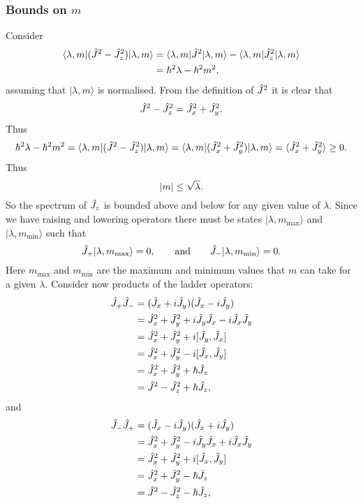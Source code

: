 \documentclass[a4paper]{article}
\renewcommand{\ket}[1]{\vert {#1} \rangle}
\renewcommand{\bra}[1]{\langle {#1} \vert}
\theoremstyle{definition}
\begin{document}
    \subsubsection{Bounds on \texorpdfstring{\(m\)}{m}}\label{sec:Bounds on m}
    Consider
    \begin{align*}
        \bra{\lambda, m}(\operator{J}^2 - \operator{J}_z^2)\ket{\lambda, m} &= \bra{\lambda, m}\operator{J}^2\ket{\lambda, m} - \bra{\lambda, m}\operator{J}_z^2\ket{\lambda, m}\\
        &= \hbar^2\lambda - \hbar^2m^2,
    \end{align*}
    assuming that \(\ket{\lambda, m}\) is normalised.
    From the definition of \(\hat{J}^2\) it is clear that
    \[\hat{J}^2 - \hat{J}_z^2 = \hat{J}_x^2 + \hat{J}_y^2.\]
    Thus
    \[\hbar^2\lambda - \hbar^2m^2 = \bra{\lambda, m}(\operator{J}^2 - \operator{J}_z^2)\ket{\lambda, m}  = \bra{\lambda, m}(\operator{J}_x^2 + \operator{J}_y^2)\ket{\lambda, m} = \expected{\operator{J}_x^2 + \operator{J}_y^2} \ge 0.\]
    Thus
    \[\abs{m} \le \sqrt{\lambda}.\]
    So the spectrum of \(\hat{J}_z\) is bounded above and below for any given value of \(\lambda\).
    Since we have raising and lowering operators there must be states \(\ket{\lambda, m_{\max}}\) and \(\ket{\lambda, m_{\min}}\) such that
    \[\operator{J}_+\ket{\lambda, m_{\max}} = 0,\qquad\text{and}\qquad \operator{J}_-\ket{\lambda, m_{\min}} = 0.\]
    Here \(m_{\max}\) and \(m_{\min}\) are the maximum and minimum values that \(m\) can take for a given \(\lambda\).
    Consider now products of the ladder operators:
    \begin{align*}
        \hat{J}_+\hat{J}_- &= (\hat{J}_x + i\hat{J}_y)(\hat{J}_x - i\hat{J}_y)\\
        &= \hat{J}_x^2 + \hat{J}_y^2 + i\hat{J}_y\hat{J}_x - i\hat{J}_x\hat{J}_y\\
        &= \hat{J}_x^2 + \hat{J}_y^2 + i[\hat{J}_y, \hat{J}_x]\\
        &= \hat{J}_x^2 + \hat{J}_y^2 - i[\hat{J}_x, \hat{J}_y]\\
        &= \hat{J}_x^2 + \hat{J}_y^2 + \hbar\hat{J}_z\\
        &= \hat{J}^2 - \hat{J}_z^2 + \hbar\hat{J}_z,
    \end{align*}
    and
    \begin{align*}
        \hat{J}_-\hat{J}_+ &= (\hat{J}_x - i\hat{J}_y)(\hat{J}_x + i\hat{J}_y)\\
        &= \hat{J}_x^2 + \hat{J}_y^2 - i\hat{J}_y\hat{J}_x + i\hat{J}_x\hat{J}_y\\
        &= \hat{J}_x^2 + \hat{J}_y^2 + i[\hat{J}_x, \hat{J}_y]\\
        &= \hat{J}_x^2 + \hat{J}_y^2 - \hbar\hat{J}_z\\
        &= \hat{J}^2 - \hat{J}_z^2 - \hbar\hat{J}_z,
    \end{align*}
\end{document}
